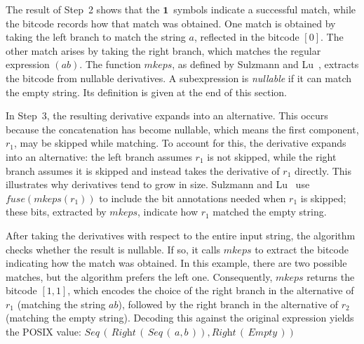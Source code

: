 \documentclass[12pt]{article}
\newcommand{\ONE}{\textbf{1}}
\newcommand{\fuse}{\textit{fuse}}
\newcommand{\mkeps}{\textit{mkeps}}
\newcommand{\Seq}{\textit{Seq}}
\newcommand{\Right}{\textit{Right}}
\newcommand{\Empty}{\textit{Empty}}
\begin{document}
The result of Step~2 shows that the $\ONE\,$ symbols indicate a successful match,  
while the bitcode records how that match was obtained.  
One match is obtained by taking the left branch to match the string $a$, reflected in the bitcode $[0]$.  
The other match arises by taking the right branch, which matches the regular expression $(ab)$.  
The function $\mkeps$, as defined by Sulzmann and Lu~\cite{Sulzmann2014}, extracts the bitcode from nullable derivatives.  
A subexpression is \emph{nullable} if it can match the empty string.  
Its definition is given at the end of this section.  

In Step~3, the resulting derivative expands into an alternative.  
This occurs because the concatenation has become nullable, which means the first component, $r_1$, may be skipped while matching.  
To account for this, the derivative expands into an alternative: the left branch assumes $r_1$ is not skipped, 
while the right branch assumes it is skipped and instead takes the derivative of $r_1$ directly.  
This illustrates why derivatives tend to grow in size.  
Sulzmann and Lu~\cite{Sulzmann2014} use $\fuse(\mkeps(r_1))$ to include the bit annotations needed when $r_1$ is skipped; 
these bits, extracted by $\mkeps$, indicate how $r_1$ matched the empty string.  

After taking the derivatives with respect to the entire input string, the algorithm checks whether the result is nullable.  
If so, it calls $\mkeps$ to extract the bitcode indicating how the match was obtained.  
In this example, there are two possible matches, but the algorithm prefers the left one.  
Consequently, $\mkeps$ returns the bitcode $[1,1]$, which encodes the choice of the right branch in the alternative of $r_1$ 
(matching the string $ab$), followed by the right branch in the alternative of $r_2$  (matching the empty string).
Decoding this against the original expression yields the POSIX value:
$
\Seq\,(\,\Right\,(\,\Seq\,(\,a, b\,)), \Right\,(\,\Empty\,))
$
\end{document}
